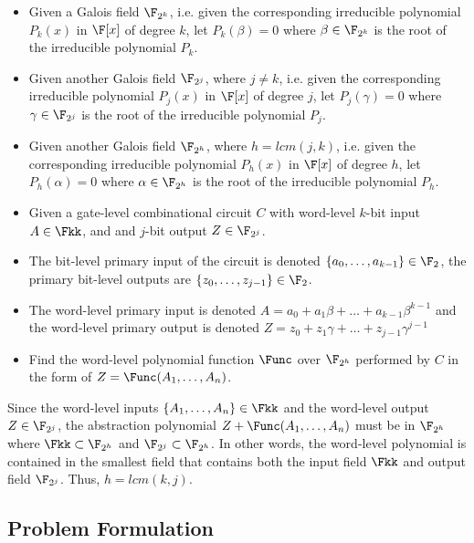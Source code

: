 \begin{itemize}
\item Given a Galois field $\F_{2^k}$, i.e. given the corresponding
irreducible polynomial $P_k(x)$ in $\F[x]$ of degree $k$,
let $P_k(\beta) = 0$ where $\beta \in \F_{2^k}$ is the root of the 
irreducible polynomial $P_k$.
\item Given another Galois field $\F_{2^j}$, where $j\neq k$, i.e. 
given the corresponding
irreducible polynomial $P_j(x)$ in $\F[x]$ of degree $j$,
let $P_j(\gamma) = 0$ where $\gamma \in \F_{2^j}$ is the root of the 
irreducible polynomial $P_j$.
\item Given another Galois field $\F_{2^h}$, where $h=lcm(j,k)$, i.e. 
given the corresponding
irreducible polynomial $P_h(x)$ in $\F[x]$ of degree $h$,
let $P_h(\alpha) = 0$ where $\alpha \in \F_{2^h}$ is the root of the 
irreducible polynomial $P_h$.
\item Given a gate-level combinational circuit $C$ with
word-level $k$-bit input $A \in \Fkk$, and
and $j$-bit output $Z \in \F_{2^j}$.
\item The bit-level primary input of the circuit is denoted
$\{a_0,\dots,a_{k-1}\} \in \F_2$,
the primary bit-level outputs are $\{z_0, \dots, z_{j-1}\} \in \F_2$.
\item The word-level primary input is denoted 
$A = a_0 + a_1\beta + \dots + a_{k-1}\beta^{k-1}$ and the word-level 
primary output is denoted $Z = z_0 + z_1\gamma + \dots + z_{j-1}\gamma^{j-1}$
\item Find the word-level polynomial function $\Func$ over $\F_{2^h}$
performed by $C$ in the form of $Z=\Func(A_1, \dots, A_n)$.
\end{itemize}

Since the word-level inputs $\{A_1, \dots, A_n\} \in \Fkk$ and the
word-level output $Z \in \F_{2^j}$, the abstraction polynomial 
$Z+\Func(A_1, \dots, A_n)$ must be in $\F_{2^h}$ where 
$\Fkk \subset \F_{2^h}$ and $\F_{2^j} \subset \F_{2^h}$. In other words,
the word-level polynomial is contained in the smallest field that contains 
both the input field $\Fkk$ and output field $\F_{2^j}$. Thus, $h=lcm(k,j)$.

\subsection{Problem Formulation}


